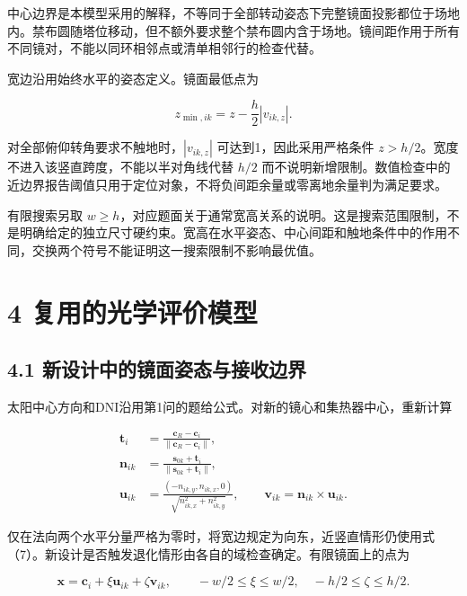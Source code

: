 \documentclass[UTF8,fontset=windows,zihao=-4]{ctexart}
\begin{document}
中心边界是本模型采用的解释，不等同于全部转动姿态下完整镜面投影都位于场地内。禁布圆随塔位移动，但不额外要求整个禁布圆内含于场地。镜间距作用于所有不同镜对，不能以同环相邻点或清单相邻行的检查代替。

\par\noindent\begin{minipage}{\linewidth}
宽边沿用始终水平的姿态定义。镜面最低点为

\[
z_{\min,ik}=z-\frac h2|v_{ik,z}|.
\tag{6}
\]
\end{minipage}\par

对全部俯仰转角要求不触地时，\(|v_{ik,z}|\) 可达到1，因此采用严格条件 \(z>h/2\)。宽度不进入该竖直跨度，不能以半对角线代替 \(h/2\) 而不说明新增限制。数值检查中的近边界报告阈值只用于定位对象，不将负间距余量或零离地余量判为满足要求。

有限搜索另取 \(w\ge h\)，对应题面关于通常宽高关系的说明。这是搜索范围限制，不是明确给定的独立尺寸硬约束。宽高在水平姿态、中心间距和触地条件中的作用不同，交换两个符号不能证明这一搜索限制不影响最优值。

\section*{4 复用的光学评价模型}

\subsection*{4.1 新设计中的镜面姿态与接收边界}

\par\noindent\begin{minipage}{\linewidth}
太阳中心方向和DNI沿用第1问的题给公式。对新的镜心和集热器中心，重新计算

\[
\begin{aligned}
\boldsymbol t_i&=\frac{\boldsymbol c_R-\boldsymbol c_i}
{\|\boldsymbol c_R-\boldsymbol c_i\|},\\
\boldsymbol n_{ik}&=\frac{\boldsymbol s_{0k}+\boldsymbol t_i}
{\|\boldsymbol s_{0k}+\boldsymbol t_i\|},\\
\boldsymbol u_{ik}&=\frac{(-n_{ik,y},n_{ik,x},0)}
{\sqrt{n_{ik,x}^2+n_{ik,y}^2}},\qquad
\boldsymbol v_{ik}=\boldsymbol n_{ik}\times\boldsymbol u_{ik}.
\end{aligned}
\tag{7}
\]
\end{minipage}\par

\par\noindent\begin{minipage}{\linewidth}
仅在法向两个水平分量严格为零时，将宽边规定为向东，近竖直情形仍使用式（7）。新设计是否触发退化情形由各自的域检查确定。有限镜面上的点为

\[
\boldsymbol x=\boldsymbol c_i+\xi\boldsymbol u_{ik}+\zeta\boldsymbol v_{ik},
\qquad
-w/2\le\xi\le w/2,\quad-h/2\le\zeta\le h/2.
\tag{8}
\]
\end{minipage}\par
\end{document}
